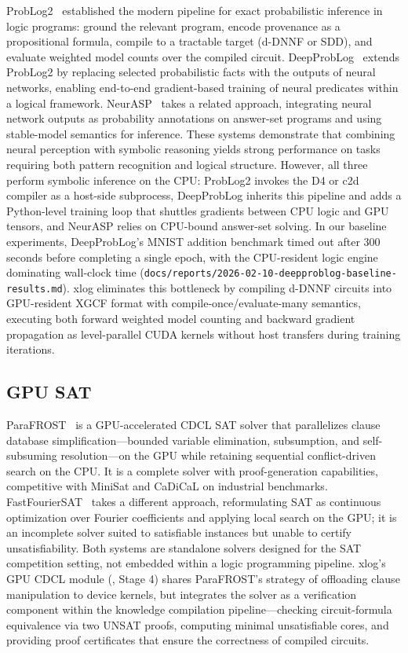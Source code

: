 ProbLog2~\cite{problog2} established the modern pipeline for exact probabilistic inference in logic programs: ground the relevant program, encode provenance as a propositional formula, compile to a tractable target (d-DNNF or SDD), and evaluate weighted model counts over the compiled circuit. DeepProbLog~\cite{deepproblog} extends ProbLog2 by replacing selected probabilistic facts with the outputs of neural networks, enabling end-to-end gradient-based training of neural predicates within a logical framework. NeurASP~\cite{neurasp} takes a related approach, integrating neural network outputs as probability annotations on answer-set programs and using stable-model semantics for inference. These systems demonstrate that combining neural perception with symbolic reasoning yields strong performance on tasks requiring both pattern recognition and logical structure. However, all three perform symbolic inference on the CPU: ProbLog2 invokes the D4 or c2d~\cite{c2d} compiler as a host-side subprocess, DeepProbLog inherits this pipeline and adds a Python-level training loop that shuttles gradients between CPU logic and GPU tensors, and NeurASP relies on CPU-bound answer-set solving. In our baseline experiments, DeepProbLog's MNIST addition benchmark timed out after 300 seconds before completing a single epoch, with the CPU-resident logic engine dominating wall-clock time (\texttt{docs/reports/2026-02-10-deepproblog-baseline-results.md}). xlog eliminates this bottleneck by compiling d-DNNF circuits into GPU-resident XGCF format with compile-once/evaluate-many semantics, executing both forward weighted model counting and backward gradient propagation as level-parallel CUDA kernels without host transfers during training iterations.

\subsection{GPU SAT}

ParaFROST~\cite{parafrost} is a GPU-accelerated CDCL SAT solver that parallelizes clause database simplification---bounded variable elimination, subsumption, and self-subsuming resolution---on the GPU while retaining sequential conflict-driven search on the CPU. It is a complete solver with proof-generation capabilities, competitive with MiniSat and CaDiCaL on industrial benchmarks. FastFourierSAT~\cite{fastfouriersat} takes a different approach, reformulating SAT as continuous optimization over Fourier coefficients and applying local search on the GPU; it is an incomplete solver suited to satisfiable instances but unable to certify unsatisfiability. Both systems are standalone solvers designed for the SAT competition setting, not embedded within a logic programming pipeline. xlog's GPU CDCL module (, Stage 4) shares ParaFROST's strategy of offloading clause manipulation to device kernels, but integrates the solver as a verification component within the knowledge compilation pipeline---checking circuit-formula equivalence via two UNSAT proofs, computing minimal unsatisfiable cores, and providing proof certificates that ensure the correctness of compiled circuits.


